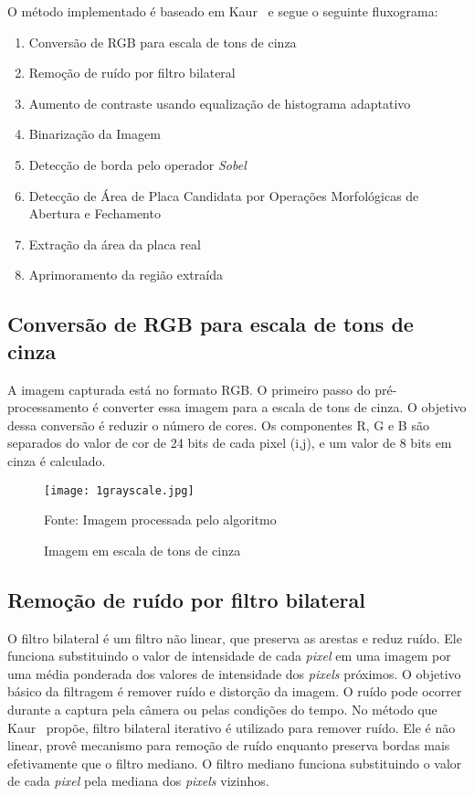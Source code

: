O método implementado é baseado em Kaur~\cite{kaur2014efficient} e segue o seguinte fluxograma:

\begin{enumerate}
	\item Conversão de RGB para escala de tons de cinza
	\item Remoção de ruído por filtro bilateral
	\item Aumento de contraste usando equalização de histograma adaptativo
	\item Binarização da Imagem
	\item Detecção de borda pelo operador \emph{Sobel}
	\item Detecção de Área de Placa Candidata por Operações Morfológicas de Abertura e Fechamento
	\item Extração da área da placa real
    \item Aprimoramento da região extraída
\end{enumerate}

\subsection{Conversão de RGB para escala de tons de cinza}

A imagem capturada está no formato RGB\@. O primeiro passo do pré-processamento é
converter essa imagem para a escala de tons de cinza. O objetivo dessa conversão é reduzir
o número de cores. Os componentes R, G e B são separados do valor de cor de 24
bits de cada pixel (i,j), e um valor de 8 bits em cinza é calculado.

\begin{figure}[H]
	\centering
	\texttt{[image: 1grayscale.jpg]}
	\caption{Imagem em escala de tons de cinza}
Fonte: Imagem processada pelo algoritmo
	\label{fig:ext_gray_scale}
\end{figure}

\subsection{Remoção de ruído por filtro bilateral}

O filtro bilateral é um filtro não linear, que preserva as arestas e reduz ruído.
Ele funciona substituindo o valor de intensidade de cada \emph{pixel} em uma imagem
por uma média ponderada dos valores de intensidade dos \emph{pixels} próximos.
O objetivo básico da filtragem é remover ruído e distorção da imagem. O ruído
pode ocorrer durante a captura pela câmera ou pelas condições do tempo. No
método que Kaur~\cite{kaur2014efficient} propõe, filtro bilateral iterativo é
utilizado para remover ruído. Ele é não linear, provê mecanismo para remoção de
ruído enquanto preserva bordas mais efetivamente que o filtro mediano. O filtro
mediano funciona substituindo o valor de cada \emph{pixel} pela mediana dos \emph{pixels}
vizinhos.


